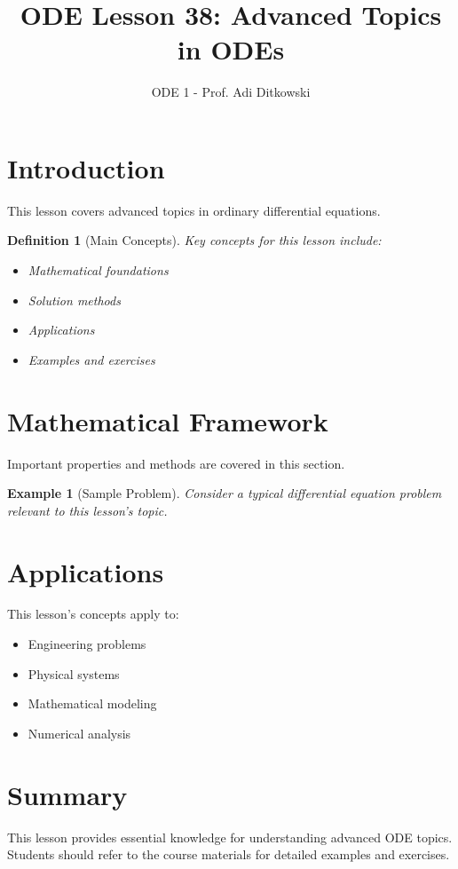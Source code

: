 \documentclass[12pt]{article}
\title{ODE Lesson 38: Advanced Topics in ODEs}
\author{ODE 1 - Prof. Adi Ditkowski}
\date{}
\newtheorem{definition}{Definition}
\newtheorem{example}{Example}
\begin{document}
\maketitle

\section{Introduction}

This lesson covers advanced topics in ordinary differential equations.

\begin{definition}[Main Concepts]
Key concepts for this lesson include:
\begin{itemize}
\item Mathematical foundations
\item Solution methods
\item Applications
\item Examples and exercises
\end{itemize}
\end{definition}

\section{Mathematical Framework}

\begin{keypoint}
Important properties and methods are covered in this section.
\end{keypoint}

\begin{example}[Sample Problem]
Consider a typical differential equation problem relevant to this lesson's topic.
\end{example}

\section{Applications}

This lesson's concepts apply to:
\begin{itemize}
\item Engineering problems
\item Physical systems
\item Mathematical modeling
\item Numerical analysis
\end{itemize}

\section{Summary}

This lesson provides essential knowledge for understanding advanced ODE topics.
Students should refer to the course materials for detailed examples and exercises.
\end{document}
